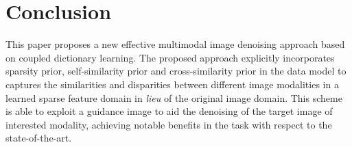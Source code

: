 \documentclass{article}
\begin{document}
\section{Conclusion}
\label{sec:Conclusion}

\vspace{-0.2cm}

This paper proposes a new effective multimodal image denoising approach based on coupled dictionary learning. The proposed approach explicitly incorporates sparsity prior, self-similarity prior and cross-similarity prior in the data model to captures the similarities and disparities between different image modalities in a learned sparse feature domain in \emph{lieu} of the original image domain. This scheme is able to exploit a guidance image to aid the denoising of the target image of interested modality, achieving notable benefits in the task with respect to the state-of-the-art.






\clearpage
\pagebreak
\end{document}
